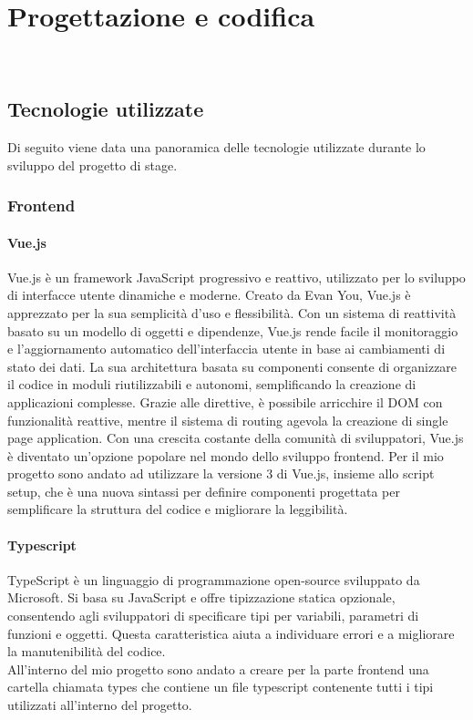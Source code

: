 \chapter{Progettazione e codifica}
\label{cap:progettazione-codifica}

\\

\section{Tecnologie utilizzate}
\label{sec:tecnologie-strumenti}

Di seguito viene data una panoramica delle tecnologie utilizzate durante lo sviluppo del progetto di stage.

\subsection{Frontend}\label{subsec:frontend}
\subsubsection{Vue.js}\label{subsubsec:vue}
Vue.js è un framework JavaScript progressivo e reattivo, utilizzato per lo sviluppo di interfacce utente dinamiche e moderne. 
Creato da Evan You, Vue.js è apprezzato per la sua semplicità d'uso e flessibilità. Con un sistema di reattività basato su un modello di oggetti e dipendenze, 
Vue.js rende facile il monitoraggio e l'aggiornamento automatico dell'interfaccia utente in base ai cambiamenti di stato dei dati. La sua architettura basata 
su componenti consente di organizzare il codice in moduli riutilizzabili e autonomi, semplificando la creazione di applicazioni complesse. 
Grazie alle direttive, è possibile arricchire il DOM con funzionalità reattive, mentre il sistema di routing agevola la creazione di single page application. 
Con una crescita costante della comunità di sviluppatori, Vue.js è diventato un'opzione popolare nel mondo dello sviluppo frontend.
Per il mio progetto sono andato ad utilizzare la versione 3 di Vue.js, insieme allo script setup, che è una nuova sintassi per definire componenti progettata per semplificare la struttura del codice e migliorare la leggibilità.

\subsubsection{Typescript}\label{subsubsec:typescript}
TypeScript è un linguaggio di programmazione open-source sviluppato da Microsoft. Si basa su JavaScript e offre tipizzazione statica opzionale, 
consentendo agli sviluppatori di specificare tipi per variabili, parametri di funzioni e oggetti. Questa caratteristica aiuta a individuare errori e a migliorare 
la manutenibilità del codice.\\
All'interno del mio progetto sono andato a creare per la parte frontend una cartella chiamata types che contiene un file typescript contenente tutti i tipi utilizzati all'interno del progetto.

